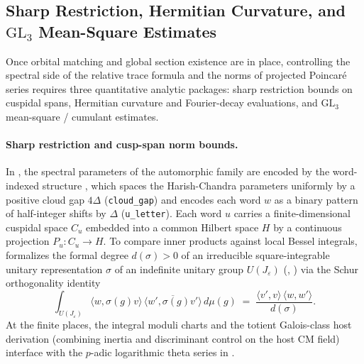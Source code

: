 \subsection{Sharp Restriction, Hermitian Curvature, and $\mathrm{GL}_3$ Mean-Square Estimates}
\label{subsec:ch03-sharp-curvature-gl3}

Once orbital matching and global section existence are in place, controlling
the spectral side of the relative trace formula and the norms of projected
Poincar\'e series requires three quantitative analytic packages: sharp
restriction bounds on cuspidal spans, Hermitian curvature and Fourier-decay
evaluations, and $\mathrm{GL}_3$ mean-square / cumulant estimates.

\paragraph{Sharp restriction and cusp-span norm bounds.}
In , the spectral parameters of the
automorphic family are encoded by the word-indexed structure
, which spaces the Harish-Chandra
parameters uniformly by a positive cloud gap $4\Delta$
(\texttt{cloud\_gap}) and encodes each word $w$ as a binary pattern of
half-integer shifts by $\Delta$ (\texttt{u\_letter}).
Each word $u$ carries a finite-dimensional cuspidal space $C_u$ embedded into a
common Hilbert space $H$ by a continuous projection $P_u : C_u \to H$.
To compare inner products against local Bessel integrals,
formalizes the formal degree $d(\sigma) > 0$ of an irreducible square-integrable
unitary representation $\sigma$ of an indefinite unitary group $U(J_\varepsilon)$
(, )
via the Schur orthogonality identity
\[
  \int_{U(J_\varepsilon)} \langle w, \sigma(g) v \rangle\,
  \overline{\langle w', \sigma(g) v' \rangle}\, d\mu(g)
  \;=\;
  \frac{\langle v', v \rangle\, \langle w, w' \rangle}{d(\sigma)}.
\]
At the finite places, the integral moduli charts
 and the totient
Galois-class host derivation  (combining
inertia and discriminant control on the host CM field) interface with the
$p$-adic logarithmic theta series in
.

